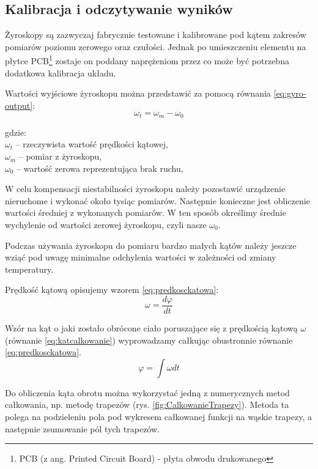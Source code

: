 \subsection{Kalibracja i odczytywanie wyników}
Żyroskopy są zazwyczaj fabrycznie testowane i kalibrowane pod kątem zakresów pomiarów poziomu zerowego oraz czułości. 
Jednak po umieszczeniu elementu na płytce PCB\footnote{PCB (z ang. Printed
Circuit Board) - płyta obwodu drukowanego} zostaje on poddany naprężeniom przez
co może być potrzebna dodatkowa kalibracja układu.

Wartości wyjściowe żyroskopu można przedstawić za pomocą równania
\ref{eq:gyro-output}:
\begin{equation}
	\label{eq:gyro-output}
  \omega_{t} = \omega_{m} - \omega_{0}
\end{equation}
\begin{tabbing}
  gdzie: \= \\
    \> $\omega_{t}$ -- rzeczywista wartość prędkości kątowej, \\
    \> $\omega_{m}$ -- pomiar z żyroskopu,\\
    \> $\omega_{0}$ -- wartość zerowa reprezentująca brak ruchu,\\
\end{tabbing}

W celu kompensacji niestabilności żyroskopu należy pozostawić urządzenie
nieruchome i wykonać około tysiąc pomiarów. Następnie konieczne jest obliczenie
wartości średniej z wykonanych pomiarów. W ten sposób określimy średnie wychylenie od wartości zerowej żyroskopu, czyli nasze $\omega_{0}$.

Podczas używania żyroskopu do pomiaru bardzo małych kątów należy jeszcze wziąć pod uwagę minimalne odchylenia wartości w
zależności od zmiany temperatury.

Prędkość kątową opisujemy wzorem \ref{eq:predkosckatowa}: 
\begin{equation}
  \label{eq:predkosckatowa}
  \omega = \frac{d\varphi}{dt}
\end{equation}

Wzór na kąt o jaki zostało obrócone ciało poruszające się z prędkością kątową
$\omega$ (równanie \ref{eq:katcalkowanie}) wyprowadzamy całkując obustronnie
równanie \ref{eq:predkosckatowa}.
\begin{equation}
  \label{eq:katcalkowanie}
  \varphi = \int \omega dt
\end{equation}

Do obliczenia kąta obrotu można wykorzystać jedną z numerycznych metod
całkowania, np. metodę trapezów (rys. \ref{fig:CalkowanieTrapezy}). Metoda ta
polega na podzieleniu pola pod wykresem całkowanej funkcji na wąskie trapezy, a następnie zsumowanie pól tych
trapezów.

